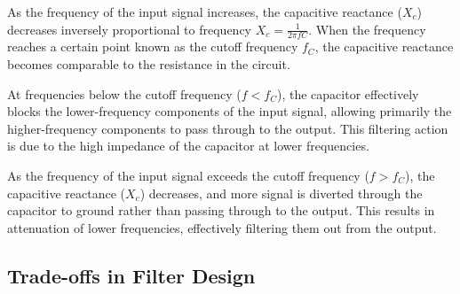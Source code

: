 \documentclass{zc-ust-hw}
\begin{document}
As the frequency of the input signal increases, the capacitive reactance ($X_{c}$)
decreases inversely proportional to frequency $X_{c} = \frac{1}{2\pi fC}$. When
the frequency reaches a certain point known as the cutoff frequency $f_C$, the
capacitive reactance becomes comparable to the resistance in the circuit.

At frequencies below the cutoff frequency ($f < f_C$), the capacitor effectively
blocks the lower-frequency components of the input signal, allowing primarily
the higher-frequency components to pass through to the output. This filtering
action is due to the high impedance of the capacitor at lower frequencies.

As the frequency of the input signal exceeds the cutoff frequency ($f > f_C$), the
capacitive reactance ($X_c$) decreases, and more signal is diverted through the
capacitor to ground rather than passing through to the output. This results in
attenuation of lower frequencies, effectively filtering them out from the output.

\subsection{Trade-offs in Filter Design}
\end{document}
